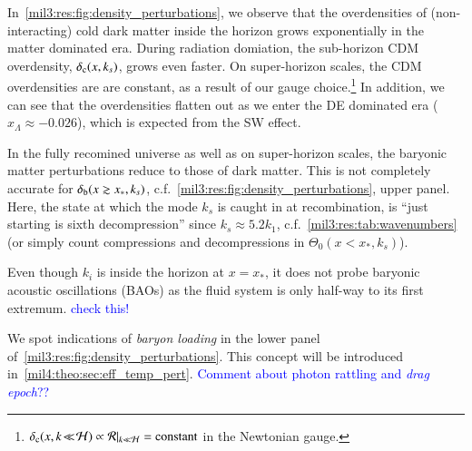 In~\cref{mil3:res:fig:density_perturbations}, we observe that the overdensities of (non-interacting) cold dark matter inside the horizon grows exponentially in the matter dominated era. During radiation domiation, the sub-horizon CDM overdensity, $\delta_\mathrm{c}(x, k_s)$, grows even faster. On super-horizon scales, the CDM overdensities are are constant, as a result of our gauge choice.\footnote{$\delta_\mathrm{c}(x, k\!\ll\! \mathcal{H}) \propto \mathcal{R}|_{k\ll \mathcal{H}} = \text{constant}$ in the Newtonian gauge.} In addition, we can see that the overdensities flatten out as we enter the DE dominated era ($x_\Lambda\approx -0.026$), which is expected from the SW effect.

In the fully recomined universe as well as on super-horizon scales, the baryonic matter perturbations reduce to those of dark matter. This is not completely accurate for $\delta_\mathrm{b}(x\gtrsim x_*,k_s)$, c.f.~\cref{mil3:res:fig:density_perturbations}, upper panel. Here, the state at which the mode $k_s$ is caught in at recombination, is ``just starting is sixth decompression'' since $k_s\approx 5.2 k_1$, c.f.~\cref{mil3:res:tab:wavenumbers} (or simply count compressions and decompressions in $\Theta_0(x\!<\!x_*, k_s)$). 

Even though $k_i$ is inside the horizon at $x=x_*$, it does not probe baryonic acoustic oscillations (BAOs) as the fluid system is only half-way to its first extremum. \textcolor{blue}{check this!}

We spot indications of \textit{baryon loading} in the lower panel of~\cref{mil3:res:fig:density_perturbations}. This concept will be introduced in~\cref{mil4:theo:sec:eff_temp_pert}. \textcolor{blue}{Comment about photon rattling and \textit{drag epoch}??}







